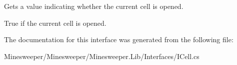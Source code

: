 Gets a value indicating whether the current cell is opened. 

True if the current cell is opened.

The documentation for this interface was generated from the following file\+:\begin{DoxyCompactItemize}
\item 
Minesweeper/\+Minesweeper/\+Minesweeper.\+Lib/\+Interfaces/I\+Cell.\+cs\end{DoxyCompactItemize}
